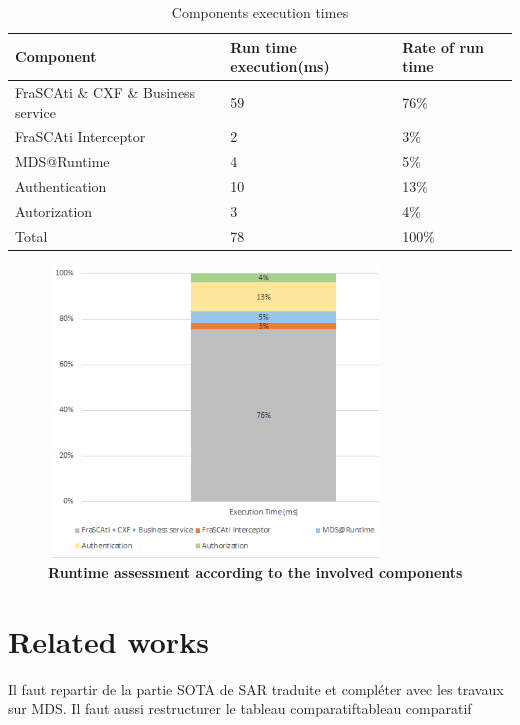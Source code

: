 \documentclass[runningheads,a4paper]{llncs}
\begin{document}
\begin{table}

\caption{Components execution times}
\begin{tabular}{@{}*{3}{|p{3.1cm}}|@{} }
\hline
Component & Run time execution(ms)   & Rate of run time \\[0.2cm]
  \hline
  FraSCAti \& CXF \& Business service & 59&  76\%\\
 FraSCAti Interceptor & 2&  3\%\\ 
 MDS@Runtime & 4&  5\%\\
 Authentication& 10& 13\%\\
 Autorization & 3& 4\%\\
 \hline
   Total & 78& 100\%\\
    \hline

\end{tabular}
\end{table}


\begin{figure}[ht]  
\centering
\includegraphics[height=220pt, width=250pt]{runtimeAssessment1.PNG}
\caption{\textbf{Runtime assessment according to the involved components
}}
\label{fig:SecaaS}
\end{figure}








\section{Related works}

Il faut repartir de la partie SOTA de SAR traduite et compl\'eter avec les travaux sur MDS. Il faut aussi restructurer le tableau comparatiftableau comparatif
\end{document}
